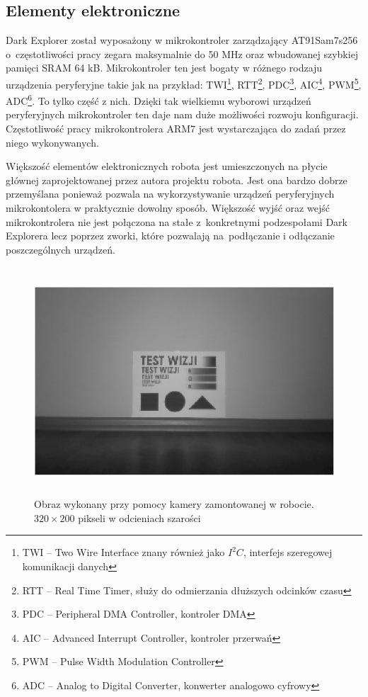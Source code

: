 \subsection{Elementy elektroniczne}
Dark Explorer został wyposażony w mikrokontroler zarządzający AT91Sam7s256 o~częstotliwości pracy zegara maksymalnie do 50 MHz oraz wbudowanej szybkiej
pamięci SRAM 64 kB. Mikrokontroler ten jest bogaty w różnego rodzaju urządzenia
peryferyjne takie jak na przykład: TWI\footnote{TWI -- Two Wire Interface znany
również jako $I^{2}C$, interfejs szeregowej komunikacji danych}, RTT\footnote{RTT
-- Real Time Timer, służy do odmierzania dłuższych odcinków czasu},
PDC\footnote{PDC -- Peripheral DMA Controller, kontroler DMA}, AIC\footnote{AIC
-- Advanced Interrupt Controller, kontroler przerwań}, PWM\footnote{PWM -- Pulse
Width Modulation Controller}, ADC\footnote{ADC -- Analog to Digital Converter,
konwerter analogowo cyfrowy}. To tylko część z nich. Dzięki tak wielkiemu
wyborowi urządzeń peryferyjnych mikrokontroler ten daje nam duże możliwości
rozwoju konfiguracji. Częstotliwość pracy mikrokontrolera ARM7 jest wystarczająca
do zadań przez niego wykonywanych.

Większość elementów elektronicznych robota jest umieszczonych na płycie głównej
zaprojektowanej przez autora projektu robota. Jest ona bardzo dobrze przemyślana
ponieważ pozwala na wykorzystywanie urządzeń peryferyjnych mikrokontolera w
praktycznie dowolny sposób. Większość wyjść oraz wejść mikrokontrolera nie jest
połączona na stałe z~konkretnymi podzespołami Dark Explorera lecz poprzez zworki,
które pozwalają na~podłączanie i odłączanie poszczególnych urządzeń.

\begin{figure}[!ht]
 \centering
 \includegraphics[height=85mm]{../images/ch02/320x200B&W.jpg}
 \caption{Obraz wykonany przy pomocy kamery zamontowanej w robocie.
 $320\times200$ pikseli w odcieniach szarości \cite{KmakMScThesis2009}}
 \label{fig:320x200BW}
\end{figure}

